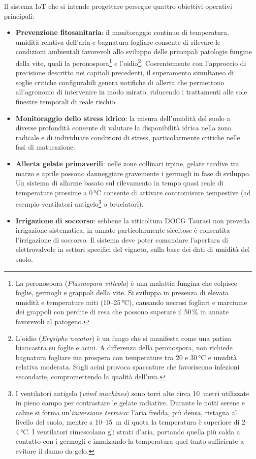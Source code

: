 Il sistema IoT che si intende progettare persegue quattro obiettivi operativi principali:

\begin{itemize}
	\item \textbf{Prevenzione fitosanitaria}: il monitoraggio continuo di temperatura, umidità relativa dell'aria e bagnatura fogliare consente di rilevare le condizioni ambientali favorevoli allo sviluppo delle principali patologie fungine della vite, quali la peronospora\footnote{La peronospora (\textit{Plasmopara viticola}) è una malattia fungina che colpisce foglie, germogli e grappoli della vite. Si sviluppa in presenza di elevata umidità e temperature miti (10--25\,°C), causando necrosi fogliari e marciume dei grappoli con perdite di resa che possono superare il 50\,\% in annate favorevoli al patogeno.} e l'oidio\footnote{L'oidio (\textit{Erysiphe necator}) è un fungo che si manifesta come una patina biancastra su foglie e acini. A differenza della peronospora, non richiede bagnatura fogliare ma prospera con temperature tra 20 e 30\,°C e umidità relativa moderata. Sugli acini provoca spaccature che favoriscono infezioni secondarie, compromettendo la qualità dell'uva.}. Coerentemente con l'approccio di precisione descritto nei capitoli precedenti, il superamento simultaneo di soglie critiche configurabili genera notifiche di allerta che permettono all'agronomo di intervenire in modo mirato, riducendo i trattamenti alle sole finestre temporali di reale rischio.

	\item \textbf{Monitoraggio dello stress idrico}: la misura dell'umidità del suolo a diverse profondità consente di valutare la disponibilità idrica nella zona radicale e di individuare condizioni di stress, particolarmente critiche nelle fasi di maturazione.

	\item \textbf{Allerta gelate primaverili}: nelle zone collinari irpine, gelate tardive tra marzo e aprile possono danneggiare gravemente i germogli in fase di sviluppo. Un sistema di allarme basato sul rilevamento in tempo quasi reale di temperature prossime a 0\,°C consente di attivare contromisure tempestive (ad esempio ventilatori antigelo\footnote{I ventilatori antigelo (\textit{wind machines}) sono torri alte circa 10~metri utilizzate in pieno campo per contrastare le gelate radiative. Durante le notti serene e calme si forma un'\textit{inversione termica}: l'aria fredda, più densa, ristagna al livello del suolo, mentre a 10--15~m di quota la temperatura è superiore di 2--4\,°C. I ventilatori rimescolano gli strati d'aria, portando quella più calda a contatto con i germogli e innalzando la temperatura quel tanto sufficiente a evitare il danno da gelo.} o bruciatori).

	\item \textbf{Irrigazione di soccorso}: sebbene la viticoltura DOCG Taurasi non preveda irrigazione sistematica, in annate particolarmente siccitose è consentita l'irrigazione di soccorso. Il sistema deve poter comandare l'apertura di elettrovalvole in settori specifici del vigneto, sulla base dei dati di umidità del suolo.
\end{itemize}

